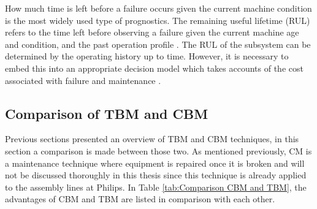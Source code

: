 How much time is left before a failure occurs given the current machine condition is the most widely used type of prognostics. The remaining useful lifetime (RUL) refers to the time left before observing a failure given the current machine age and condition, and the past operation profile \parencite{JARDINE2006}. The RUL of the subsystem can be determined by the operating history up to time. However, it is necessary to embed this into an appropriate decision model which takes accounts of the cost associated with failure and maintenance \parencite{SCARF1997}. 

\subsection{Comparison of TBM and CBM} \label{Comparison of TBM and CBM}
Previous sections presented an overview of TBM and CBM techniques, in this section a comparison is made between those two. As mentioned previously, CM is a maintenance technique where equipment is repaired once it is broken and will not be discussed thoroughly in this thesis since this technique is already applied to the assembly lines at Philips. In Table \ref{tab:Comparison CBM and TBM}, the advantages of CBM and TBM are listed in comparison with each other.

